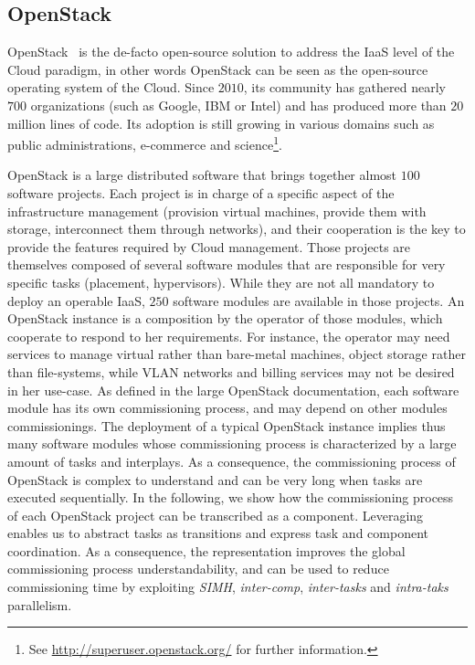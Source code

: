 
\graphicspath{{images/}}

\subsection{OpenStack}
\label{subsec:openstack}

OpenStack~\cite{os:7923796} is the de-facto open-source solution to
address the IaaS level of the Cloud paradigm, in other words OpenStack
can be seen as the open-source operating system of the Cloud. Since
$2010$, its community has gathered nearly $700$ organizations (such as
Google, IBM or Intel) and has produced more than $20$ million lines of
code. Its adoption is still growing in various domains such as public
administrations, e-commerce and science\footnote{See
  \url{http://superuser.openstack.org/} for further information.}.

OpenStack is a large distributed software that brings together almost
$100$ software projects. Each project is in charge of a specific
aspect of the infrastructure management (\eg provision virtual
machines, provide them with storage, interconnect them through
networks), and their cooperation is the key to provide the features
required by Cloud management.
%
Those projects are themselves composed of several software modules
that are responsible for very specific tasks (\eg placement,
hypervisors). While they are not all mandatory to deploy an operable
IaaS, $250$ software modules are available in those projects.
%
An OpenStack instance is a composition by the operator of those modules, which
cooperate to respond to her requirements. For instance, the operator may need
services to manage virtual rather than bare-metal machines, object storage
rather than file-systems, while VLAN networks and billing services may not be
desired in her use-case. As defined in the large OpenStack documentation, each
software module has its own commissioning process, and may depend on other
modules commissionings.
%
The deployment of a typical OpenStack instance implies thus many software
modules whose commissioning process is characterized by a large amount of tasks
and interplays. As a consequence, the commissioning process of OpenStack is
complex to understand and can be very long when tasks are executed sequentially.
%
In the following, we show how the commissioning process of each
OpenStack project can be transcribed as a \mad component. Leveraging
\mad enables us to abstract tasks as transitions and express task and
component coordination. As a consequence, the \mad representation
improves the global commissioning process understandability, and can
be used to reduce commissioning time by exploiting \emph{SIMH},
\emph{inter-comp}, \emph{inter-tasks} and \emph{intra-taks}
parallelism.

